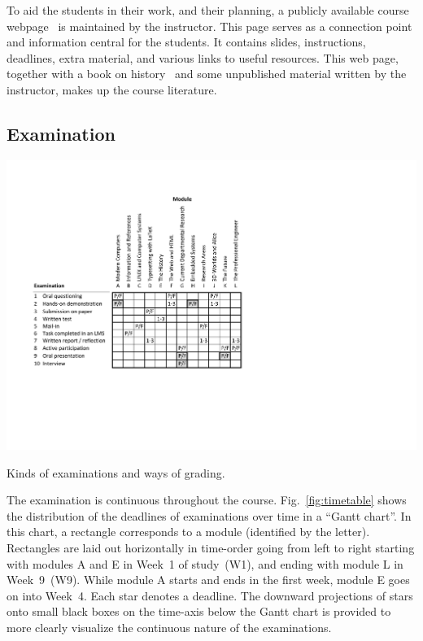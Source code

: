 \documentclass[conference]{IEEEtran}
\begin{document}
To aid the students in their work, and their planning, a publicly available course webpage~\cite{web-d0015e} is maintained by the instructor. This page serves as a connection point and information central for the students. It contains slides, instructions, deadlines, extra material, and various links to useful resources. This web page, together with a book on history~\cite{Sundin06} and some unpublished material written by the instructor, makes up the course literature. 

\subsection{Examination}

\begin{table}[!t]
  \centering
  \includegraphics[width=\columnwidth]{examination}
  \caption{Kinds of examinations and ways of grading.}
  \label{fig:examination}
\end{table}

The examination is continuous throughout the course. Fig.~\ref{fig:timetable} shows the distribution of the deadlines of examinations over time in a ``Gantt chart''. In this chart, a rectangle corresponds to a module (identified by the letter). Rectangles are laid out horizontally in time-order going from left to right starting with modules A and E in Week~1 of study~(W1), and ending with module L in Week~9~(W9). While module A starts and ends in the first week, module E goes on into Week~4. Each star denotes a deadline. The downward projections of stars onto small black boxes on the time-axis below the Gantt chart is provided to more clearly visualize the continuous nature of the examinations. 
\end{document}
